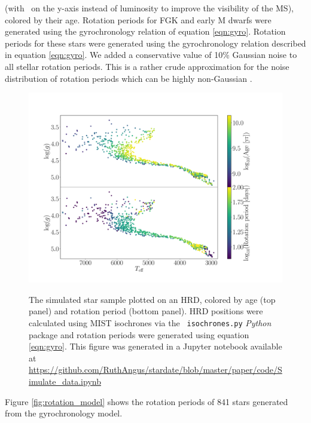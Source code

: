 (with \logg\ on the y-axis instead of luminosity to improve the visibility of
the MS), colored by their age.
Rotation periods for FGK and early M dwarfs were generated using the
gyrochronology relation of equation \ref{eqn:gyro}.
Rotation periods for these stars were generated using the gyrochronology
relation described in equation \ref{eqn:gyro}.
We added a conservative value of 10\% Gaussian noise to all stellar
rotation periods.
This is a rather crude approximation for the noise distribution of rotation
periods which can be highly non-Gaussian \citep[\eg][]{aigrain2015,
angus2018}.
\begin{figure}
  \caption{
      The simulated star sample plotted on an HRD, colored by age
    (top panel) and rotation period (bottom panel).
    HRD positions were calculated using MIST isochrones via the {\tt
    isochrones.py} {\it Python} package and rotation periods were generated
    using equation \ref{eqn:gyro}.
    This figure was generated in a Jupyter notebook available at
    \url{https://github.com/RuthAngus/stardate/blob/master/paper/code/Simulate_data.ipynb}
}
  \centering
    \includegraphics[width=1\textwidth]{simulated_CMD}
\label{fig:CMD_age}
\end{figure}
Figure \ref{fig:rotation_model} shows the rotation periods of 841
stars generated from the gyrochronology model.
